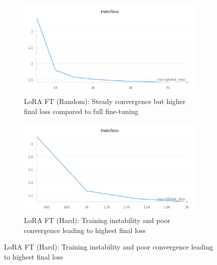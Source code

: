 \documentclass[conference]{IEEEtran}
\begin{document}
\begin{figure}[t]
\centering
\begin{subfigure}{0.48\textwidth}
\includegraphics[width=\textwidth]{lora_finetuned_1million.png}
\caption{LoRA FT (Random): Steady convergence but higher final loss compared to full fine-tuning}
\end{subfigure}
\hfill
\begin{subfigure}{0.48\textwidth}
\includegraphics[width=\textwidth]{lora_finetuned_hard_negatives.png}
\caption{LoRA FT (Hard): Training instability and poor convergence leading to highest final loss}
\end{subfigure}


\end{figure}
\end{document}
